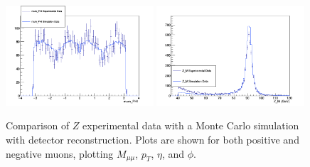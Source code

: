 \documentclass[a4paper]{article}
\begin{document}
\begin{figure}[p]
\includegraphics[width=0.49\textwidth]{Measurement_mum_PHI.png}
\includegraphics[clip, trim = 0.5cm 0cm 1.7cm 1.3cm, width=0.49\textwidth]{Measurement_Z_M.png}
\vspace{-4mm}
\caption{\small Comparison of $Z$ experimental data with a Monte Carlo simulation with detector reconstruction. Plots are shown for both positive and negative muons, plotting $M_{\mu\mu}$, $p_T$, $\eta$, and $\phi$.}
\label{fig: Z histograms}
\end{figure}




\end{document}
